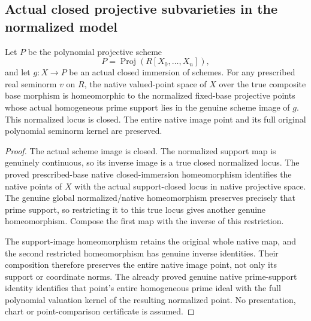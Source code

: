\subsection{Actual closed projective subvarieties in the normalized model}
\label{subsec:native-closed-projective-spaces}

\begin{theorem}
\label{projective:native-closed-normalized-comparison}
\leanok
{}
Let $P$ be the polynomial projective scheme
\[
 P=\operatorname{Proj}(R[X_0,\ldots,X_n]),
\]
and let $g:X\to P$ be an actual closed immersion of schemes. For any prescribed real seminorm $v$ on $R$, the
native valued-point space of $X$ over the true composite base morphism
is homeomorphic to the normalized fixed-base projective points whose
actual homogeneous prime support lies in the genuine scheme image of
$g$. This normalized locus is closed. The entire native image point and
its full original polynomial seminorm kernel are preserved.
\end{theorem}
\begin{proof}
The actual scheme image is closed. The normalized support map is genuinely
continuous, so its inverse image is a true closed normalized locus.
The proved prescribed-base native closed-immersion homeomorphism
identifies the native points of $X$ with the actual support-closed locus
in native projective space. The genuine global normalized/native
homeomorphism preserves precisely that prime support, so restricting it
to this true locus gives another genuine homeomorphism. Compose the
first map with the inverse of this restriction.

The support-image homeomorphism retains the original whole native map,
and the second restricted homeomorphism has genuine inverse identities.
Their composition therefore preserves the entire native image point,
not only its support or coordinate norms. The already proved genuine
native prime-support identity identifies that point's entire homogeneous
prime ideal with the full polynomial valuation kernel of the resulting
normalized point. No presentation, chart or point-comparison certificate
is assumed.
\end{proof}

